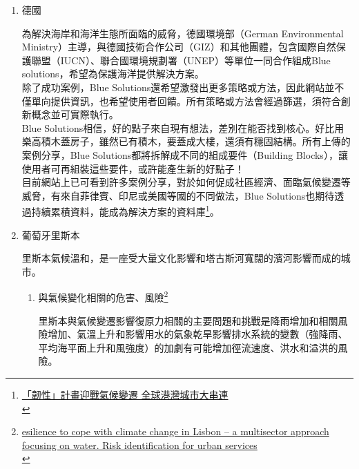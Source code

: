 \documentclass[a4paper,12pt]{article}
\begin{document}
\begin{enumerate}
\item 德國
\label{sec:orgba6c24b}

為解決海岸和海洋生態所面臨的威脅，德國環境部（German Environmental Ministry）主導，與德國技術合作公司（GIZ）和其他團體，包含國際自然保護聯盟（IUCN）、聯合國環境規劃署（UNEP）等單位一同合作組成Blue solutions，希望為保護海洋提供解決方案。\\

除了成功案例，Blue Solutions還希望激發出更多策略或方法，因此網站並不僅單向提供資訊，也希望使用者回饋。所有策略或方法會經過篩選，須符合創新概念並可實際執行。\\

Blue Solutions相信，好的點子來自現有想法，差別在能否找到核心。好比用樂高積木蓋房子，雖然已有積木，要蓋成大樓，還須有穩固結構。所有上傳的案例分享，Blue Solutions都將拆解成不同的組成要件（Building Blocks），讓使用者可再組裝這些要件，或許能產生新的好點子！\\

目前網站上已可看到許多案例分享，對於如何促成社區經濟、面臨氣候變遷等威脅，有來自菲律賓、印尼或美國等國的不同做法，Blue Solutions也期待透過持續累積資料，能成為解決方案的資料庫\footnote{\href{https://e-info.org.tw/node/103499}{「韌性」計畫迎戰氣候變遷 全球港灣城市大串連 }\\}。\\

\item 葡萄牙里斯本
\label{sec:orgfb6a9df}

里斯本氣候溫和，是一座受大量文化影響和塔古斯河寬闊的濱河影響而成的城市。\\
\begin{enumerate}
\item 與氣候變化相關的危害、風險\footnote{\href{https://www.researchgate.net/publication/322526416\_Resilience\_to\_cope\_with\_climate\_change\_in\_Lisbon\_-\_a\_multisector\_approach\_focusing\_on\_water\_Risk\_identification\_for\_urban\_services}{esilience to cope with climate change in Lisbon – a multisector approach focusing on water. Risk identification for urban services}\\}
\label{sec:org57ec549}

里斯本與氣候變遷影響復原力相關的主要問題和挑戰是降雨增加和相關風險增加、氣溫上升和影響用水的氣象乾旱影響排水系統的變數（強降雨、平均海平面上升和風強度）的加劇有可能增加徑流速度、洪水和溢洪的風險。\\


\end{enumerate}
\end{enumerate}
\end{document}
